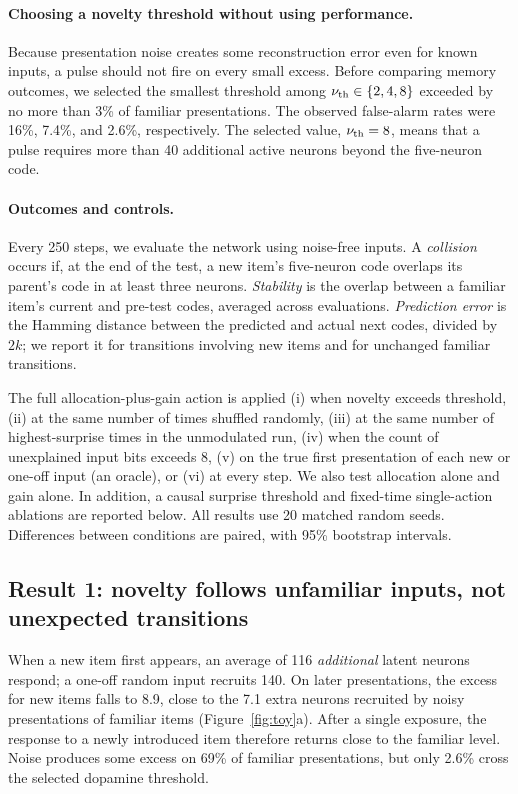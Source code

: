 \documentclass[11pt,a4paper]{article}
\begin{document}
\paragraph{Choosing a novelty threshold without using performance.}
Because presentation noise creates some reconstruction error even for known inputs, a pulse should not fire on every small excess. Before comparing memory outcomes, we selected the smallest threshold among $\nu_{\rm th}\in\{2,4,8\}$ exceeded by no more than 3\% of familiar presentations. The observed false-alarm rates were 16\%, 7.4\%, and 2.6\%, respectively. The selected value, $\nu_{\rm th}=8$, means that a pulse requires more than 40 additional active neurons beyond the five-neuron code.

\paragraph{Outcomes and controls.}
Every 250 steps, we evaluate the network using noise-free inputs. A \emph{collision} occurs if, at the end of the test, a new item's five-neuron code overlaps its parent's code in at least three neurons. \emph{Stability} is the overlap between a familiar item's current and pre-test codes, averaged across evaluations. \emph{Prediction error} is the Hamming distance between the predicted and actual next codes, divided by $2k$; we report it for transitions involving new items and for unchanged familiar transitions.

The full allocation-plus-gain action is applied (i) when novelty exceeds threshold, (ii) at the same number of times shuffled randomly, (iii) at the same number of highest-surprise times in the unmodulated run, (iv) when the count of unexplained input bits exceeds 8, (v) on the true first presentation of each new or one-off input (an oracle), or (vi) at every step. We also test allocation alone and gain alone. In addition, a causal surprise threshold and fixed-time single-action ablations are reported below. All results use 20 matched random seeds. Differences between conditions are paired, with 95\% bootstrap intervals.

\subsection{Result 1: novelty follows unfamiliar inputs, not unexpected transitions}
When a new item first appears, an average of 116 \emph{additional} latent neurons respond; a one-off random input recruits 140. On later presentations, the excess for new items falls to 8.9, close to the 7.1 extra neurons recruited by noisy presentations of familiar items (Figure~\ref{fig:toy}a). After a single exposure, the response to a newly introduced item therefore returns close to the familiar level. Noise produces some excess on 69\% of familiar presentations, but only 2.6\% cross the selected dopamine threshold.
\end{document}
